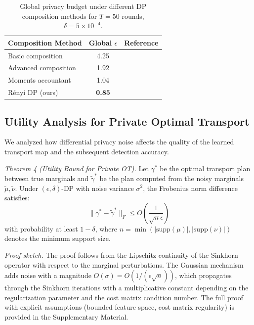 \documentclass{ieeeaccess}
\theoremstyle{plain}
\theoremstyle{definition}
\theoremstyle{remark}
\begin{document}
\begin{table}[!t]
\renewcommand{\arraystretch}{1.2}
\caption{Global privacy budget under different DP composition methods for $T = 50$ rounds, $\delta = 5 \times 10^{-4}$.}
\label{tab:composition}
\centering
\begin{tabular}{lcc}
\hline
\textbf{Composition Method} & \textbf{Global} $\epsilon$ & \textbf{Reference} \\
\hline
Basic composition & 4.25 & \cite{dwork2006} \\
Advanced composition & 1.92 & \cite{kairouz2015} \\
Moments accountant & 1.04 & \cite{abadi2016} \\
R\'{e}nyi DP (ours) & \textbf{0.85} & \cite{mironov2017} \\
\hline
\end{tabular}
\end{table}

\subsection{Utility Analysis for Private Optimal Transport}

We analyzed how differential privacy noise affects the quality of the learned transport map and the subsequent detection accuracy.

\textit{Theorem 4 (Utility Bound for Private OT).} Let $\gamma^*$ be the optimal transport plan between true marginals and $\tilde{\gamma}^*$ be the plan computed from the noisy marginals $\tilde{\mu}, \tilde{\nu}$. Under $(\epsilon, \delta)$-DP with noise variance $\sigma^2$, the Frobenius norm difference satisfies:
\begin{equation}
\|\gamma^* - \tilde{\gamma}^*\|_F \leq O\left(\frac{1}{\sqrt{n}\epsilon}\right)
\end{equation}
with probability at least $1 - \delta$, where $n = \min(|\text{supp}(\mu)|, |\text{supp}(\nu)|)$ denotes the minimum support size.

\textit{Proof sketch.} The proof follows from the Lipschitz continuity of the Sinkhorn operator with respect to the marginal perturbations. The Gaussian mechanism adds noise with a magnitude $O(\sigma) = O(1/(\epsilon\sqrt{n}))$, which propagates through the Sinkhorn iterations with a multiplicative constant depending on the regularization parameter and the cost matrix condition number. The full proof with explicit assumptions (bounded feature space, cost matrix regularity) is provided in the Supplementary Material.
\end{document}
